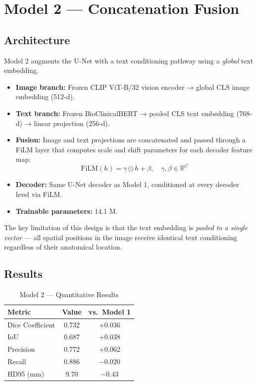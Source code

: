 \documentclass[12pt,a4paper]{article}
\begin{document}
\section{Model 2 — Concatenation Fusion}

\subsection{Architecture}
Model 2 augments the U-Net with a text conditioning pathway using a
\textit{global} text embedding.

\begin{itemize}
  \item \textbf{Image branch:} Frozen CLIP ViT-B/32 vision encoder →
    global CLS image embedding (512-d).
  \item \textbf{Text branch:} Frozen BioClinicalBERT → pooled CLS
    text embedding (768-d) → linear projection (256-d).
  \item \textbf{Fusion:} Image and text projections are concatenated
    and passed through a FiLM layer that computes
    scale and shift parameters for each decoder feature map:
    \begin{equation}
      \text{FiLM}(h) = \gamma \odot h + \beta,\quad \gamma,\beta\in\mathbb{R}^C
      \label{eq:film}
    \end{equation}
  \item \textbf{Decoder:} Same U-Net decoder as Model 1, conditioned at
    every decoder level via FiLM.
  \item \textbf{Trainable parameters:} 14.1 M.
\end{itemize}

The key limitation of this design is that the text embedding is
\textit{pooled to a single vector} — all spatial positions in the image
receive identical text conditioning regardless of their anatomical location.

\subsection{Results}

\begin{table}[H]
\centering
\caption{Model 2 — Quantitative Results}
\begin{tabular}{lcc}
\toprule
\textbf{Metric} & \textbf{Value} & \textbf{vs.\ Model 1} \\
\midrule
Dice Coefficient  & 0.732 & $+$0.036 \\
IoU               & 0.687 & $+$0.038 \\
Precision         & 0.772 & $+$0.062 \\
Recall            & 0.886 & $-$0.020 \\
HD95 (mm)         & 9.70  & $-$0.43 \\
\bottomrule
\end{tabular}
\label{tab:m2}
\end{table}
\end{document}
